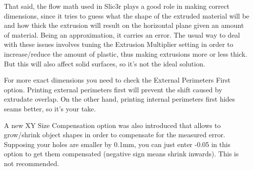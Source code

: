 That said, the flow math used in Slic3r plays a good role in making correct dimensions, since it tries to guess what the shape of the extruded material will be and how thick the extrusion will result on the horizontal plane given an amount of material. Being an approximation, it carries an error. The usual way to deal with these issues involves tuning the Extrusion Multiplier setting in order to increase/reduce the amount of plastic, thus making extrusions more or less thick. But this will also affect solid surfaces, so it's not the ideal solution.

For more exact dimensions you need to check the External Perimeters First option. Printing external perimeters first will prevent the shift caused by extrudate overlap. On the other hand, printing internal perimeters first hides seams better, so it's your take.

A new XY Size Compensation option was also introduced that allows to grow/shrink object shapes in order to compensate for the measured error. Supposing your holes are smaller by 0.1mm, you can just enter -0.05 in this option to get them compensated (negative sign means shrink inwards). This is not recommended.


